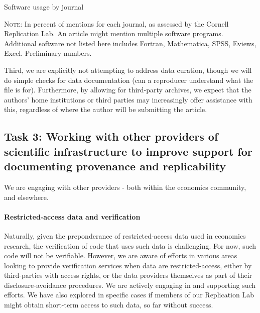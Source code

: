 \documentclass[AEJ]{AEA}
\begin{document}
\begin{table}
	\caption{Software usage by journal\label{tab:software_by_journal}} 
	\small

\begin{minipage}{0.7\textwidth}
\textsc{Note:} In percent of mentions for each journal, as assessed by the Cornell Replication Lab. An article might mention multiple software programs. Additional software not listed here includes Fortran, Mathematica, SPSS, Eviews, Excel. Preliminary numbers. 
\end{minipage}
\end{table}


Third, we are explicitly not attempting to address data curation, though we will do simple checks for data documentation (can a reproducer understand what the file is for). Furthermore,  by allowing for third-party archives, we expect that the authors' home institutions or third parties may increasingly offer assistance with this, regardless of where the author will be submitting the article. 

\FloatBarrier

\subsection{Task 3: Working with other providers of scientific infrastructure to improve support for documenting provenance and replicability}
We are engaging with other providers - both within the economics community, and elsewhere. 

\paragraph{Restricted-access data and verification} Naturally, given the preponderance of restricted-access data used in economics research, the verification of code that uses such data is challenging. For now, such code will not be verifiable. However, we are aware of efforts in various areas looking to provide verification services when data are restricted-access, either by third-parties with access rights, or the data providers themselves as part of their disclosure-avoidance procedures. We  are actively engaging in and supporting such efforts. We have also explored in specific cases if members of our Replication Lab might  obtain short-term access to such data, so far without success.
\end{document}

